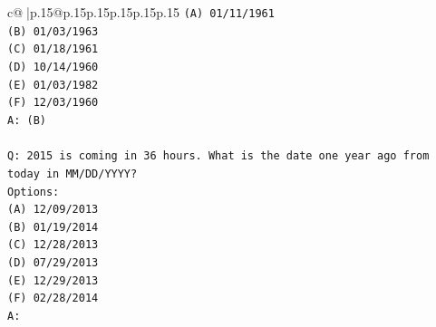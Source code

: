 \documentclass{article}
\begin{document}
{\begin{supertabular}{c@{$\;$}|p{.15\linewidth}@{}p{.15\linewidth}p{.15\linewidth}p{.15\linewidth}p{.15\linewidth}p{.15\linewidth}}
{{{\texttt{(A) 01/11/1961} \\
\texttt{(B) 01/03/1963} \\
\texttt{(C) 01/18/1961} \\
\texttt{(D) 10/14/1960} \\
\texttt{(E) 01/03/1982} \\
\texttt{(F) 12/03/1960} \\
\texttt{A: (B)} \\
\\ 
\texttt{Q: 2015 is coming in 36 hours. What is the date one year ago from today in MM/DD/YYYY?} \\
\texttt{Options:} \\
\texttt{(A) 12/09/2013} \\
\texttt{(B) 01/19/2014} \\
\texttt{(C) 12/28/2013} \\
\texttt{(D) 07/29/2013} \\
\texttt{(E) 12/29/2013} \\
\texttt{(F) 02/28/2014} \\
\texttt{A:} \\
            }
        }
    }
     \\ \\


\end{supertabular}}
\end{document}
